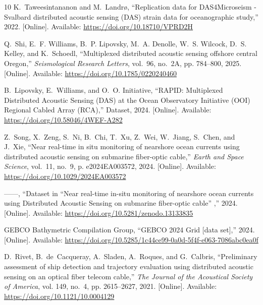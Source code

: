\documentclass[11pt]{article}
\begin{document}
\begin{thebibliography}{10}
\BIBentryALTinterwordspacing
K.~Taweesintananon and M.~Landrø, ``{Replication data for DAS4Microseism -
  Svalbard distributed acoustic sensing (DAS) strain data for oceanographic
  study},'' 2022. [Online]. Available: \url{https://doi.org/10.18710/VPRD2H}
\BIBentrySTDinterwordspacing

\BIBentryALTinterwordspacing
Q.~Shi, E.~F. Williams, B.~P. Lipovsky, M.~A. Denolle, W.~S. Wilcock, D.~S.
  Kelley, and K.~Schoedl, ``{Multiplexed distributed acoustic sensing offshore
  central Oregon},'' \emph{Seismological Research Letters}, vol.~96, no.~2A,
  pp. 784--800, 2025. [Online]. Available:
  \url{https://doi.org/10.1785/0220240460}
\BIBentrySTDinterwordspacing

\BIBentryALTinterwordspacing
B.~Lipovsky, E.~Williams, and O.~O. Initiative, ``{{RAPID}: Multiplexed
  Distributed Acoustic Sensing ({DAS}) at the Ocean Observatory Initiative
  ({OOI}) Regional Cabled Array ({RCA})},'' Dataset, 2024. [Online]. Available:
  \url{https://doi.org/10.58046/4WEF-A282}
\BIBentrySTDinterwordspacing

\BIBentryALTinterwordspacing
Z.~Song, X.~Zeng, S.~Ni, B.~Chi, T.~Xu, Z.~Wei, W.~Jiang, S.~Chen, and J.~Xie,
  ``Near real-time in situ monitoring of nearshore ocean currents using
  distributed acoustic sensing on submarine fiber-optic cable,'' \emph{Earth
  and Space Science}, vol.~11, no.~9, p. e2024EA003572, 2024. [Online].
  Available: \url{https://doi.org/10.1029/2024EA003572}
\BIBentrySTDinterwordspacing

\BIBentryALTinterwordspacing
------, ``{Dataset in ``Near real-time in-situ monitoring of nearshore ocean
  currents using Distributed Acoustic Sensing on submarine fiber-optic cable''
  },'' 2024. [Online]. Available: \url{https://doi.org/10.5281/zenodo.13133835}
\BIBentrySTDinterwordspacing

\BIBentryALTinterwordspacing
{GEBCO Bathymetric Compilation Group}, ``{GEBCO 2024 Grid [data set]},'' 2024.
  [Online]. Available:
  \url{https://doi.org/10.5285/1c44ce99-0a0d-5f4f-e063-7086abc0ea0f}
\BIBentrySTDinterwordspacing

\BIBentryALTinterwordspacing
D.~Rivet, B.~de~Cacqueray, A.~Sladen, A.~Roques, and G.~Calbris, ``{Preliminary
  assessment of ship detection and trajectory evaluation using distributed
  acoustic sensing on an optical fiber telecom cable},'' \emph{The Journal of
  the Acoustical Society of America}, vol. 149, no.~4, pp. 2615--2627, 2021.
  [Online]. Available: \url{https://doi.org/10.1121/10.0004129}
\BIBentrySTDinterwordspacing


\end{thebibliography}
\end{document}

